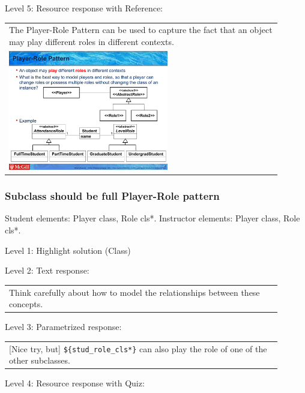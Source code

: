 \noindent Level 5: Resource response with Reference: \medskip

\begin{tabular}{|p{0.9\linewidth}}
The Player-Role Pattern can be used to capture the fact that an object may play different roles
in different contexts.

\\
\includegraphics[width=0.6\textwidth]{images/player_role.png}
\end{tabular} \medskip


\subsubsection{Subclass should be full Player-Role pattern}

Student elements: Player class, Role cls*. Instructor elements: Player class, Role cls*. \medskip

\noindent Level 1: Highlight solution (Class) \medskip

\noindent Level 2: Text response: \medskip

\begin{tabular}{|p{0.9\linewidth}}
Think carefully about how to model the relationships between these concepts.
\end{tabular} \medskip

\noindent Level 3: Parametrized response: \medskip

\begin{tabular}{|p{0.9\linewidth}}
[Nice try, but] \verb|${stud_role_cls*}| can also play the role of one of the other subclasses.
\end{tabular} \medskip

\noindent Level 4: Resource response with Quiz: \medskip


